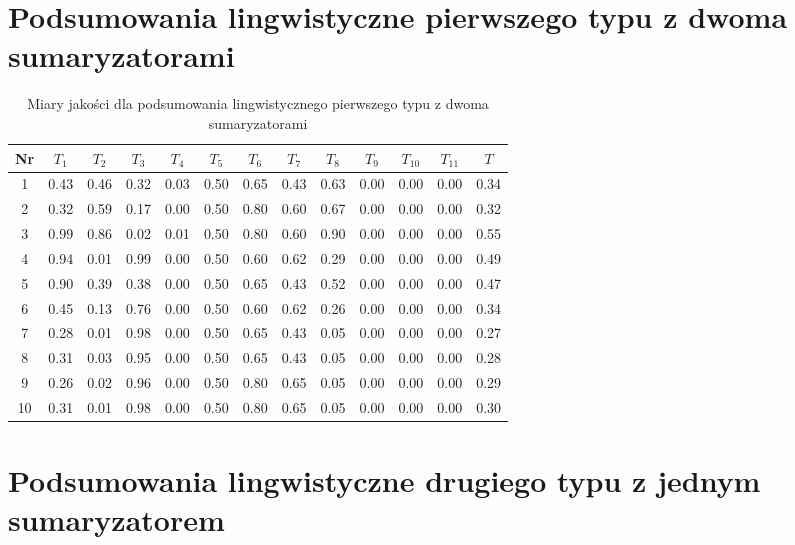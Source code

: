 \documentclass{article}
\begin{document}
    \section{Podsumowania lingwistyczne pierwszego typu z dwoma sumaryzatorami}
    \begin{table}[h!]
    \centering
    \begin{tabular}{|c|c|c|c|c|c|c|c|c|c|c|c|c|}
    \hline
    \textbf{Nr} & \textbf{\(T_1\)} &\textbf{\(T_2\)} & \textbf{\(T_3\)} & \textbf{\(T_4\)} & \textbf{\(T_5\)} & \textbf{\(T_6\)} & \textbf{\(T_7\)} & \textbf{\(T_8\)} & \textbf{\(T_9\)} & \textbf{\(T_{10}\)} & \textbf{\(T_{11}\)} & \textbf{\(T\)}\\
    \hline
    1 & 0.43 & 0.46 & 0.32 & 0.03 & 0.50 & 0.65 & 0.43 & 0.63 & 0.00 & 0.00 & 0.00 & 0.34 \\
    \hline
    2 & 0.32 & 0.59 & 0.17 & 0.00 & 0.50 & 0.80 & 0.60 & 0.67 & 0.00 & 0.00 & 0.00 & 0.32 \\
    \hline
    3 & 0.99 & 0.86 & 0.02 & 0.01 & 0.50 & 0.80 & 0.60 & 0.90 & 0.00 & 0.00 & 0.00 & 0.55 \\
    \hline
    4 & 0.94 & 0.01 & 0.99 & 0.00 & 0.50 & 0.60 & 0.62 & 0.29 & 0.00 & 0.00 & 0.00 & 0.49 \\
    \hline
    5 & 0.90 & 0.39 & 0.38 & 0.00 & 0.50 & 0.65 & 0.43 & 0.52 & 0.00 & 0.00 & 0.00 & 0.47 \\
    \hline
    6 & 0.45 & 0.13 & 0.76 & 0.00 & 0.50 & 0.60 & 0.62 & 0.26 & 0.00 & 0.00 & 0.00 & 0.34 \\
    \hline
    7 & 0.28 & 0.01 & 0.98 & 0.00 & 0.50 & 0.65 & 0.43 & 0.05 & 0.00 & 0.00 & 0.00 & 0.27 \\
    \hline
    8 & 0.31 & 0.03 & 0.95 & 0.00 & 0.50 & 0.65 & 0.43 & 0.05 & 0.00 & 0.00 & 0.00 & 0.28 \\
    \hline
    9 & 0.26 & 0.02 & 0.96 & 0.00 & 0.50 & 0.80 & 0.65 & 0.05 & 0.00 & 0.00 & 0.00 & 0.29 \\
    \hline
    10 & 0.31 & 0.01 & 0.98 & 0.00 & 0.50 & 0.80 & 0.65 & 0.05 & 0.00 & 0.00 & 0.00 & 0.30 \\
    \hline
    \end{tabular}
    \caption{Miary jakości dla podsumowania lingwistycznego pierwszego typu z dwoma sumaryzatorami}
    \end{table}

    \section{Podsumowania lingwistyczne drugiego typu z jednym sumaryzatorem}
    
\end{document}
